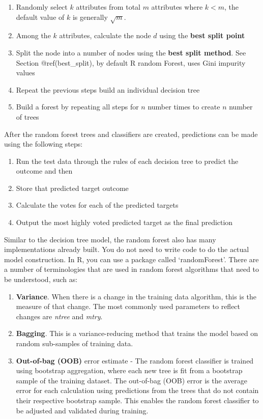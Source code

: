 \documentclass[
]{book}
\providecommand{\tightlist}{%
  \setlength{\itemsep}{0pt}\setlength{\parskip}{0pt}}
\begin{document}
\begin{enumerate}
\def\labelenumi{\arabic{enumi}.}
\tightlist
\item
  Randomly select \(k\) attributes from total \(m\) attributes where \(k < m\), the default value of \(k\) is generally \(\sqrt{m}\).
\item
  Among the \(k\) attributes, calculate the node \(d\) using the \textbf{best split point}
\item
  Split the node into a number of nodes using the \textbf{best split method}. See Section @ref(best\_split), by default R random Forest, uses Gini impurity values
\item
  Repeat the previous steps build an individual decision tree
\item
  Build a forest by repeating all steps for \(n\) number times to create \(n\) number of trees
\end{enumerate}

After the random forest trees and classifiers are created, predictions can be made using the following steps:

\begin{enumerate}
\def\labelenumi{\arabic{enumi}.}
\tightlist
\item
  Run the test data through the rules of each decision tree to predict the outcome and then
\item
  Store that predicted target outcome
\item
  Calculate the votes for each of the predicted targets
\item
  Output the most highly voted predicted target as the final prediction
\end{enumerate}

Similar to the decision tree model, the random forest also has many implementations already built. You do not need to write code to do the actual model construction. In R, you can use a package called `randomForest'. There are a number of terminologies that are used in random forest algorithms that need to be understood, such as:

\begin{enumerate}
\def\labelenumi{\arabic{enumi}.}
\item
  \textbf{Variance}. When there is a change in the training data algorithm, this is the measure of that change. The most commonly used parameters to reflect changes are \emph{ntree} and \emph{mtry}.
\item
  \textbf{Bagging}. This is a variance-reducing method that trains the model based on random sub-samples of training data.
\item
  \textbf{Out-of-bag (OOB)} error estimate - The random forest classifier is trained using bootstrap aggregation, where each new tree is fit from a bootstrap sample of the training dataset. The out-of-bag (OOB) error is the average error for each calculation using predictions from the trees that do not contain their respective bootstrap sample. This enables the random forest classifier to be adjusted and validated during training.
\end{enumerate}
\end{document}
